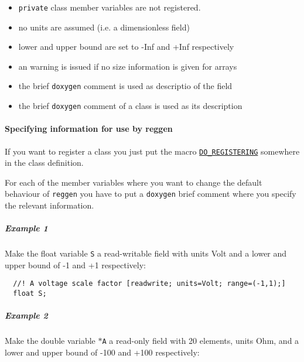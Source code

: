 \begin{itemize}
\item {\tt private} class member variables are not registered.\end{itemize}


\begin{itemize}
\item no units are assumed (i.e. a dimensionless field)\end{itemize}


\begin{itemize}
\item lower and upper bound are set to -Inf and +Inf respectively\end{itemize}


\begin{itemize}
\item an warning is issued if no size information is given for arrays\end{itemize}


\begin{itemize}
\item the brief {\tt doxygen} comment is used as descriptio of the field\end{itemize}


\begin{itemize}
\item the brief {\tt doxygen} comment of a class is used as its description\end{itemize}
\hypertarget{fields_spec}{}\paragraph{Specifying information for use by reggen}\label{fields_spec}
If you want to register a class you just put the macro {\tt \hyperlink{csimclass_8h_a8}{DO\_\-REGISTERING}} somewhere in the class definition.

For each of the member variables where you want to change the default behaviour of {\tt reggen} you have to put a {\tt doxygen} brief comment where you specify the relevant information.\hypertarget{fields_e1}{}\subparagraph{Example 1}\label{fields_e1}
Make the float variable {\tt S} a read-writable field with units Volt and a lower and upper bound of -1 and +1 respectively: 

\footnotesize\begin{verbatim}  //! A voltage scale factor [readwrite; units=Volt; range=(-1,1);]
  float S;
\end{verbatim}
\normalsize
\hypertarget{fields_e2}{}\subparagraph{Example 2}\label{fields_e2}
Make the double variable {\tt $\ast$A} a read-only field with 20 elements, units Ohm, and a lower and upper bound of -100 and +100 respectively: 

